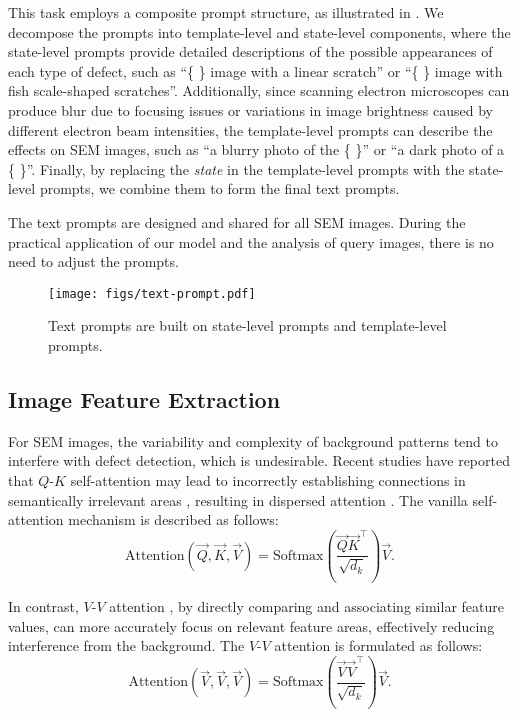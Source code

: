 This task employs a composite prompt structure, as illustrated in .  We decompose the prompts into template-level and state-level components, where the state-level prompts provide detailed descriptions of the possible appearances of each type of defect, such as ``\{ \} image with a linear scratch'' or ``\{ \} image with fish scale-shaped scratches''. Additionally, since scanning electron microscopes can produce blur due to focusing issues or variations in image brightness caused by different electron beam intensities, the template-level prompts can describe the effects on SEM images, such as ``a blurry photo of the \{ \}'' or ``a dark photo of a \{ \}''. Finally, by replacing the \textit{state} in the template-level prompts with the state-level prompts, we combine them to form the final text prompts.

The text prompts are designed and shared for all SEM images. During the practical application of our model and the analysis of query images, there is no need to adjust the prompts.
\begin{figure}[tb!]
  \centering
  \texttt{[image: figs/text-prompt.pdf]}
  \caption{Text prompts are built on state-level prompts and template-level prompts. }
  \label{fig:text_prompt}
\end{figure}

\subsection{Image Feature Extraction}

For SEM images, the variability and complexity of background patterns tend to interfere with defect detection, which is undesirable. Recent studies have reported that $Q$-$K$ self-attention \cite{DNN-2017NeurIPS-Attention} may lead to incorrectly establishing connections in semantically irrelevant areas
, resulting in dispersed attention \cite{li2023clip}. The vanilla self-attention mechanism is described as follows:
\begin{equation}
   \text{Attention}(\vec{Q}, \vec{K}, \vec{V}) = \text{Softmax}\left( \frac{\vec{Q}\vec{K}^\top}{\sqrt{d_k}} \right) \vec{V}.
\label{eq:QKV}
\end{equation}

In contrast, $V$-$V$ attention \cite{li2023clip}, by directly comparing and associating similar feature values, can more accurately focus on relevant feature areas, effectively reducing interference from the background. The $V$-$V$ attention is formulated as follows:
\begin{equation}
    \text{Attention}( \vec{V}, \vec{V}, \vec{V} ) = \text{Softmax}\left(\frac{\vec{V}\vec{V}^\top}{\sqrt{d_k}}\right) \vec{V}.
    \label{eq:VVV}
\end{equation}

